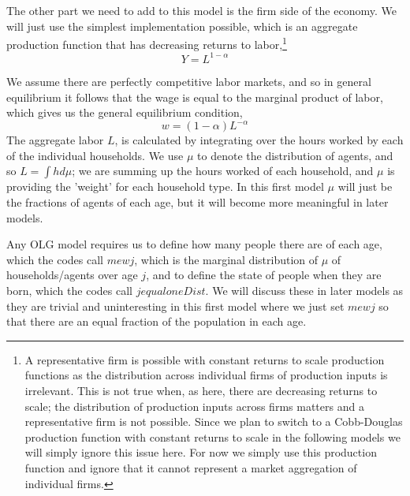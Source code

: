 The other part we need to add to this model is the firm side of the economy. We will just use the simplest implementation possible, which is an aggregate production function that has decreasing returns to labor,\footnote{A representative firm is possible with constant returns to scale production functions as the distribution across individual firms of production inputs is irrelevant. This is not true when, as here, there are decreasing returns to scale; the distribution of production inputs across firms matters and a representative firm is not possible. Since we plan to switch to a Cobb-Douglas production function with constant returns to scale in the following models we will simply ignore this issue here. For now we simply use this production function and ignore that it cannot represent a market aggregation of individual firms.}
\begin{equation}
 Y=L^{1-\alpha}
\end{equation}

We assume there are perfectly competitive labor markets, and so in general equilibrium it follows that the wage is equal to the marginal product of labor, which gives us the general equilibrium condition,
\begin{equation}
 w=(1-\alpha)L^{-\alpha}
\end{equation}
The aggregate labor $L$, is calculated by integrating over the hours worked by each of the individual households. We use $\mu$ to denote the distribution of agents, and so $L= \int h d\mu$; we are summing up the hours worked of each household, and $\mu$ is providing the 'weight' for each household type. In this first model $\mu$ will just be the fractions of agents of each age, but it will become more meaningful in later models.

Any OLG model requires us to define how many people there are of each age, which the codes call $mewj$, which is the marginal distribution of $\mu$ of households/agents over age $j$, and to define the state of people when they are born, which the codes call $jequaloneDist$. We will discuss these in later models as they are trivial and uninteresting in this first model where we just set $mewj$ so that there are an equal fraction of the population in each age.


